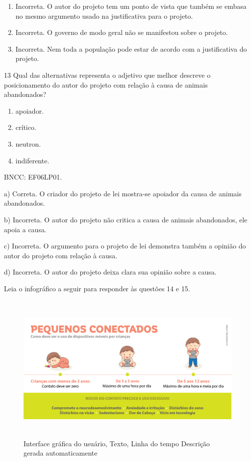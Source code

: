 \begin{enumerate}
\def\labelenumi{\alph{enumi})}
\setcounter{enumi}{1}
\item
  Incorreta. O autor do projeto tem um ponto de vista que também se
  embasa no mesmo argumento usado na justificativa para o projeto.
\item
  Incorreta. O governo de modo geral não se manifestou sobre o projeto.
\item
  Incorreta. Nem toda a população pode estar de acordo com a
  justificativa do projeto.
\end{enumerate}

\num{13} Qual das alternativas representa o adjetivo que melhor descreve
o posicionamento do autor do projeto com relação à causa de animais
abandonados?

\begin{enumerate}
\def\labelenumi{\alph{enumi})}
\item
  apoiador.
\item
  crítico.
\item
  neutron.
\item
  indiferente.
\end{enumerate}

BNCC: EF06LP01.

a) Correta. O criador do projeto de lei mostra-se apoiador da causa de
animais abandonados.

b) Incorreta. O autor do projeto não critica a causa de animais
abandonados, ele apoia a causa.

c) Incorreta. O argumento para o projeto de lei demonstra também a
opinião do autor do projeto com relação à causa.

d) Incorreta. O autor do projeto deixa clara sua opinião sobre a causa.

Leia o infográfico a seguir para responder às questões 14 e 15.

\begin{figure}
\centering
\includegraphics[width=5.90556in,height=2.88125in]{./imgSAEB_6_POR/media/image46.png}
\caption{Interface gráfica do usuário, Texto, Linha do tempo Descrição
gerada automaticamente}
\end{figure}

